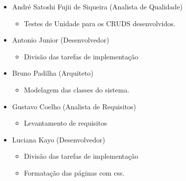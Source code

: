 \documentclass[12pt,letterpaper]{article}
\begin{document}
\begin{itemize}

\item {}André Satoshi Fujii de Siqueira (Analista de Qualidade)\\
\vspace{-0.5cm}
\begin{itemize}
\item{}Testes de Unidade para os CRUDS desenvolvidos.
\end{itemize}
\vspace{0.5cm}

\item {}Antonio Junior (Desenvolvedor)\\
\vspace{-0.5cm}
\begin{itemize}
\item{}Divisão das tarefas de implementação
\end{itemize}
\vspace{0.5cm}

\item {}Bruno Padilha (Arquiteto)\\
\vspace{-0.5cm}
\begin{itemize}
\item{}Modelagem das classes do sistema.
\end{itemize}
\vspace{0.5cm}

\item {}Gustavo Coelho (Analista de Requisitos)\\
\vspace{-0.5cm}
\begin{itemize}
\item{}Levantamento de requisitos
\end{itemize}
\vspace{0.5cm}

\item {}Luciana Kayo (Desenvolvedor)\\
\vspace{-0.5cm}
\begin{itemize}
\item{}Divisão das tarefas de implementação\\
\item{}Formatação das páginas com css.
\end{itemize}
\vspace{0.5cm}


\end{itemize}
\end{document}
